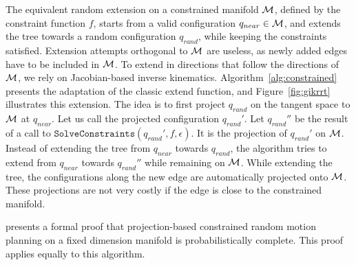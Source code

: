 The equivalent random extension on a constrained manifold $\mathcal{M}$,
defined by the constraint function $f$, starts from a valid
configuration $q_{near} \in \mathcal{M}$, and extends the tree towards a
random configuration $q_{rand}$, while keeping the constraints
satisfied. Extension attempts orthogonal to $\mathcal{M}$ are useless,
as newly added edges have to be included in $\mathcal{M}$. To extend in
directions that follow the directions of $\mathcal{M}$, we rely on
Jacobian-based inverse kinematics. Algorithm~\ref{alg:constrained}
presents the adaptation of the classic extend function, and
Figure~\ref{fig:gikrrt} illustrates this extension. The idea is to
first project $q_{rand}$ on the tangent space to $\mathcal{M}$ at
$q_{near}$. Let us call the projected configuration $q_{rand}'$. Let
$q_{rand}''$ be the result of a call to
$\texttt{SolveConstraints}(q_{rand}',f,\epsilon)$.  It is the
projection of $q_{rand}'$ on $\mathcal{M}$. Instead of extending the
tree from $q_{near}$ towards $q_{rand}$, the algorithm tries to extend
from $q_{near}$ towards $q_{rand}''$ while remaining on
$\mathcal{M}$. While extending the tree, the configurations along the
new edge are automatically projected onto $\mathcal{M}$. These
projections are not very costly if the edge is close to the
constrained manifold.

\cite{berenson2011task} presents a formal proof that projection-based
constrained random motion planning on a fixed dimension manifold is
probabilistically complete. This proof applies equally to this
algorithm.


